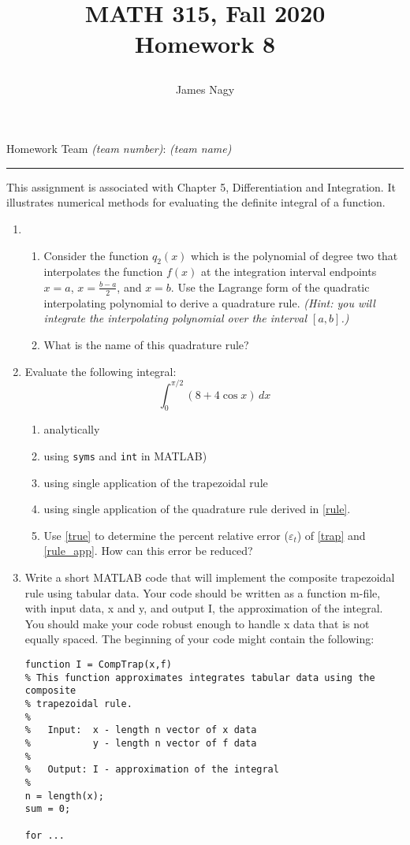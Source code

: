 \documentclass[12pt]{article}
\title{MATH 315, Fall 2020 \\[3pt]
Homework 8
\date{}}
\author{James Nagy}
\begin{document}
\maketitle

\begin{center}
Homework Team \textit{(team number)}: \textit{(team name)} \\
\rule[0pt]{12cm}{1pt}
\end{center}


This assignment is associated with Chapter 5, Differentiation and Integration. It illustrates numerical methods for evaluating the definite integral of a function.
\begin{enumerate}
\item \begin{enumerate}
\item Consider the function $q_2(x)$ which is the polynomial of degree
two that interpolates the function $f(x)$ at the integration interval endpoints
$x = a$, $x=\frac{b-a}{2}$, and $x = b$.  Use the Lagrange form of the quadratic interpolating polynomial to derive a quadrature rule. \textit{(Hint: you will integrate the interpolating polynomial over the interval $[a,b]$.)}\label{rule}
\item What is the name of this quadrature rule? 
\end{enumerate}
\item Evaluate the following integral:
\begin{equation*}
\int^{\pi/2}_0 (8 + 4\cos x) \,dx
\end{equation*}
\begin{enumerate}
\item \label{a} analytically \label{true}
\item using {\tt syms} and {\tt int} in MATLAB)
\item using single application of the trapezoidal rule \label{trap}
\item using single application of the quadrature rule derived in \ref{rule}. \label{rule_app}
\item Use \ref{true} to determine the percent relative error ($\varepsilon_t$) of \ref{trap} and \ref{rule_app}. How can this error be reduced?
\end{enumerate}
\pagebreak
\item 
Write a short MATLAB code that will implement the composite trapezoidal rule using tabular data. Your code should be written as a function m-file, with input data, x and y, and output I, the approximation of the integral. You should make your code robust enough to handle x data that is not equally spaced. The beginning of your code might contain the following:

{\footnotesize
\begin{verbatim}
function I = CompTrap(x,f)
% This function approximates integrates tabular data using the composite
% trapezoidal rule.
% 
%   Input:  x - length n vector of x data
%           y - length n vector of f data
% 
%   Output: I - approximation of the integral
% 
n = length(x);
sum = 0;

for ...

\end{verbatim}
}
\end{enumerate}
\end{document}
